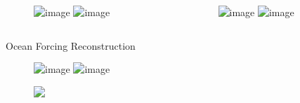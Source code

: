 \documentclass[hide notes,intlimits]{beamer}
\begin{document}
  
  
\begin{frame}
  \begin{columns}[t]
    \begin{column}{2cm}
      \begin{figure}
        \includegraphics<1>[width=\textwidth]{roman-motyka-yakutat}
        \includegraphics<2>[width=\textwidth]{pism_logo_v2_transp}
      \end{figure}
    \end{column}
    \begin{column}{10cm}
      \begin{figure}
        \includegraphics<1>[width=\textwidth]{jib_1985_speed_observed}
        \includegraphics<2>[width=\textwidth]{jib_1985_speed_simulated}
      \end{figure}
    \end{column}
  \end{columns}
\end{frame}

\begin{frame}{Ocean Forcing Reconstruction}
      \begin{figure}
        \includegraphics<1>[height=0.8\textheight]{jib_ocean_observation_categorical_1980_2020}
        \includegraphics<2>[height=0.8\textheight]{jib_ocean_forcing_1980_2020_normalized}
      \end{figure}
\end{frame}




\begin{frame}
      \begin{figure}
        \includegraphics<1>[width=\textwidth]{jib_total_grounding_line_flux}
      \end{figure}
\end{frame}


\begin{frame}[plain]
  \begin{figure}
\end{figure}
\end{frame}
\end{document}
